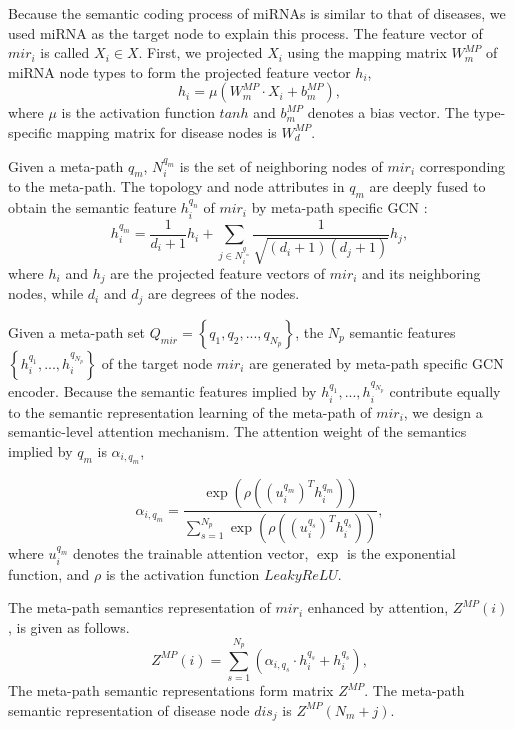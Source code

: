 \documentclass[journal,twoside,web]{ieeecolor}
\begin{document}
Because the semantic coding process of miRNAs is similar to that of diseases, we used miRNA as the target node to explain this process. The feature vector of $mi{r_i}$ is called ${X_i} \in X$. First, we projected ${X_i}$ using the mapping matrix $W_m^{MP}$ of miRNA node types to form the projected feature vector ${h_i}$,
\begin{equation}
{h_i} = \mu \left( {W_m^{MP} \cdot {X_i} + b_m^{MP}} \right),
\end{equation}
where $\mu $ is the activation function $tanh$ and $b_m^{MP}$ denotes a bias vector. The type-specific mapping matrix for disease nodes is $W_d^{MP}$.

Given a meta-path ${q_m}$, $N_i^{{q_m}}$ is the set of neighboring nodes of $mi{r_i}$ corresponding to the meta-path. The topology and node attributes in ${q_m}$ are deeply fused to obtain the semantic feature $h_i^{{q_n}}$ of $mi{r_i}$ by meta-path specific GCN \cite{37}:
\begin{equation}
h_i^{{q_m}} = \frac{1}{{{d_i} + 1}}{h_i} + \sum\limits_{j \in N_i^{{q_{_m}}}} {\frac{1}{{\sqrt {\left( {{d_i} + 1} \right)\left( {{d_j} + 1} \right)} }}{h_j}},
\end{equation}
where ${h_i}$ and ${h_j}$ are the projected feature vectors of $mi{r_i}$ and its neighboring nodes, while ${d_i}$ and ${d_j}$ are degrees of the nodes.

Given a meta-path set ${Q_{mir}} = \left\{ {{q_1},{q_2},...,{q_{{N_p}}}} \right\}$, the ${N_p}$ semantic features $\left\{ {h_i^{{q_1}},...,h_i^{{q_{{N_p}}}}} \right\}$ of the target node $mi{r_i}$ are generated by meta-path specific GCN encoder. Because the semantic features implied by $h_i^{{q_1}},...,h_i^{{q_{{N_p}}}}$ contribute equally to the semantic representation learning of the meta-path of $mi{r_i}$, we design a semantic-level attention mechanism. The attention weight of the semantics implied by ${q_m}$ is ${\alpha _{i,{q_m}}}$,

\begin{equation}
{\alpha _{i,{q_m}}} = \frac{{\exp \left( {\rho \left( {{{\left( {u_i^{{q_m}}} \right)}^T}h_i^{{q_m}}} \right)} \right)}}{{\sum\nolimits_{s = 1}^{{N_p}} {\exp \left( {\rho \left( {{{\left( {u_i^{{q_s}}} \right)}^T}h_i^{{q_s}}} \right)} \right)} }},
\end{equation}
where $u_i^{{q_m}}$ denotes the trainable attention vector, $\exp $ is the exponential function, and $\rho $ is the activation function $LeakyReLU$.

The meta-path semantics representation of $mi{r_i}$ enhanced by attention, ${Z^{MP}}\left( i \right)$, is given as follows.
\begin{equation}
{Z^{MP}}\left( i \right) = \sum\limits_{s = 1}^{{N_p}} {\left( {{\alpha _{i,{q_s}}} \cdot h_i^{{q_s}} + h_i^{{q_s}}} \right)},
\end{equation} 
The meta-path semantic representations form matrix ${Z^{MP}}$. The meta-path semantic representation of disease node $di{s_j}$ is ${Z^{MP}}\left( {{N_m} + j} \right)$.
\end{document}

